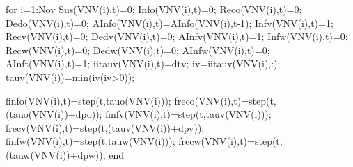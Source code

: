                                     for i=1:Nov
                                                Sus(VNV(i),t)=0;
                                                Info(VNV(i),t)=0;
                                                Reco(VNV(i),t)=0;
                                                Dedo(VNV(i),t)=0;
                                                AInfo(VNV(i),t)=AInfo(VNV(i),t-1);
                                                Infv(VNV(i),t)=1;
                                                Recv(VNV(i),t)=0;
                                                Dedv(VNV(i),t)=0;
                                                AInfv(VNV(i),t)=1; 
                                                Infw(VNV(i),t)=0;
                                                Recw(VNV(i),t)=0;
                                                Dedw(VNV(i),t)=0;
                                                AInfw(VNV(i),t)=0;
                                                AInft(VNV(i),t)=1;  
                                                iitauv(VNV(i),t)=dtv; 
                                                iv=iitauv(VNV(i),:);
                                                tauv(VNV(i))=min(iv(iv>0)); 
                                                                                                                                          
                                                finfo(VNV(i),t)=step(t,tauo(VNV(i))); %
                                                freco(VNV(i),t)=step(t,(tauo(VNV(i))+dpo)); %
                                                finfv(VNV(i),t)=step(t,tauv(VNV(i))); %
                                                frecv(VNV(i),t)=step(t,(tauv(VNV(i))+dpv)); %
                                                finfw(VNV(i),t)=step(t,tauw(VNV(i))); %
                                                frecw(VNV(i),t)=step(t,(tauw(VNV(i))+dpw)); %
                                    end
                                    
